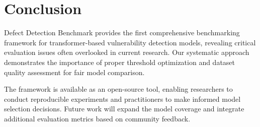 \documentclass[letterpaper]{article}
\begin{document}
\section{Conclusion}

Defect Detection Benchmark provides the first comprehensive benchmarking framework for transformer-based vulnerability detection models, revealing critical evaluation issues often overlooked in current research. Our systematic approach demonstrates the importance of proper threshold optimization and dataset quality assessment for fair model comparison.

The framework is available as an open-source tool, enabling researchers to conduct reproducible experiments and practitioners to make informed model selection decisions. Future work will expand the model coverage and integrate additional evaluation metrics based on community feedback.



\end{document}
